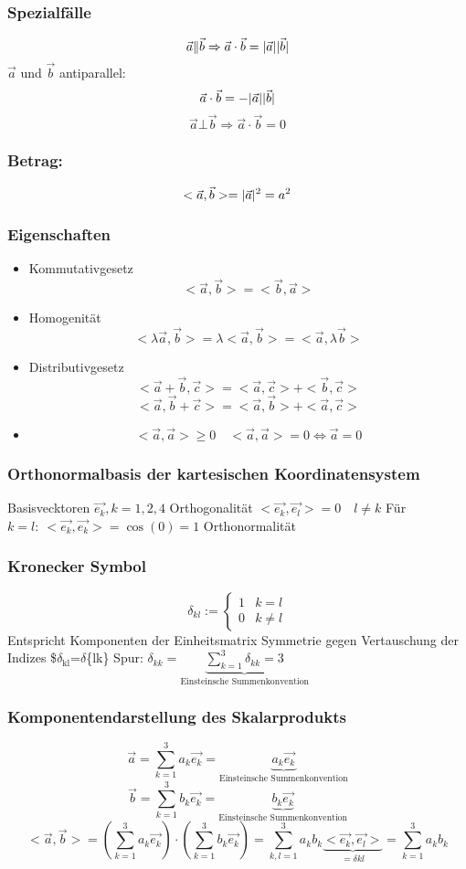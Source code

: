 \documentclass[a4paper]{scrartcl}
\DeclarePairedDelimiter\abs{\lvert}{\rvert}%
\begin{document}
\subsubsection{Spezialfälle}
\label{sec-12-2-3}
\[\vec{a}\|\vec{b}\Rightarrow \vec{a}\cdot\vec{b}=\abs{\vec{a}}\abs{\vec{b}}\]
$\vec{a}$ und $\vec{b}$ antiparallel:
\[\vec{a}\cdot\vec{b}=-\abs{\vec{a}}\abs{\vec{b}}\]
\[\vec{a}\bot\vec{b}\Rightarrow\vec{a}\cdot\vec{b}=0\]
\subsubsection{Betrag:}
\label{sec-12-2-4}
\[<\vec{a},\vec{b}>=\abs{\vec{a}}^2=a^2\]
\subsubsection{Eigenschaften}
\label{sec-12-2-5}
\begin{itemize}
\item Kommutativgesetz
\[<\vec{a},\vec{b}>=<\vec{b},\vec{a}>\]
\item Homogenität
\[<\lambda\vec{a},\vec{b}>=\lambda<\vec{a},\vec{b}>=<\vec{a},\lambda\vec{b}>\]
\item Distributivgesetz
\[<\vec{a}+\vec{b},\vec{c}>=<\vec{a},\vec{c}>+<\vec{b},\vec{c}>\]
\[<\vec{a},\vec{b}+\vec{c}>=<\vec{a},\vec{b}>+<\vec{a},\vec{c}>\]
\item \[<\vec{a},\vec{a}>\geq 0 \quad <\vec{a},\vec{a}>=0\Leftrightarrow\vec{a}=0\]
\end{itemize}
\subsubsection{Orthonormalbasis der kartesischen Koordinatensystem}
\label{sec-12-2-6}
Basisvecktoren $\vec{e_k}, k=1,2,4$
Orthogonalität $<\vec{e_k},\vec{e_l}> = 0\quad l\neq k$
Für $k=l:~<\vec{e_k},\vec{e_k}>=\cos(0)=1$
Orthonormalität
\subsubsection{Kronecker Symbol}
\label{sec-12-2-7}
\[\delta_{kl}:=\begin{cases}1&k=l\\0&k\neq l\end{cases}\]
Entspricht Komponenten der Einheitsmatrix
Symmetrie gegen Vertauschung der Indizes \$$\delta$$_{\text{kl}}$=$\delta$\{lk\}
Spur: $\delta_{kk} = \underbrace{\sum_{k=1}^3 \delta_{kk}=3}_{\text{Einsteinsche Summenkonvention}}$
\subsubsection{Komponentendarstellung des Skalarprodukts}
\label{sec-12-2-8}
\[\vec{a}=\sum_{k=1}^3 a_k \vec{e_k}=\underbrace{a_k \vec{e_k}}_{\text{Einsteinsche Summenkonvention}}\]
\[\vec{b}=\sum_{k=1}^3 b_k \vec{e_k}=\underbrace{b_k \vec{e_k}}_{\text{Einsteinsche Summenkonvention}}\]
\[<\vec{a},\vec{b}>=(\sum_{k=1}^3 a_k\vec{e_k})\cdot (\sum_{k=1}^3 b_k\vec{e_k}) = \sum_{k,l=1}^3 a_k b_k \underbrace{<\vec{e_k},\vec{e_l}>}_{=\delta{kl}} = \sum_{k=1}^3 a_k b_k\]
\end{document}
